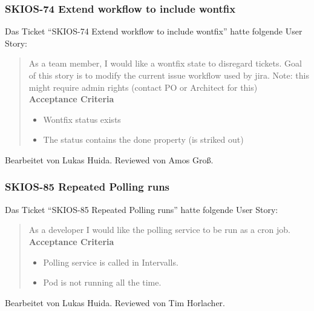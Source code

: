 \subsubsection{SKIOS-74 Extend workflow to include wontfix}
Das Ticket \enquote{SKIOS-74 Extend workflow to include wontfix} hatte folgende User Story:
\begin{quotation}
    As a team member, I would like a wontfix state to disregard tickets.
    Goal of this story is to modify the current issue workflow used by jira.
    Note: this might require admin rights (contact PO or Architect for this) \\
    \textbf{Acceptance Criteria}
    \begin{itemize}
        \item Wontfix status exists
        \item The status contains the done property (is striked out)
    \end{itemize}
\end{quotation}
Bearbeitet von Lukas Huida.
Reviewed von Amos Groß.

\subsubsection{SKIOS-85 Repeated Polling runs}
Das Ticket \enquote{SKIOS-85 Repeated Polling runs} hatte folgende User Story:
\begin{quotation}
    As a developer I would like the polling service to be run as a cron job. \\
    \textbf{Acceptance Criteria}
    \begin{itemize}
        \item Polling service is called in Intervalls.
        \item Pod is not running all the time.
    \end{itemize}
\end{quotation}
Bearbeitet von Lukas Huida.
Reviewed von Tim Horlacher.

